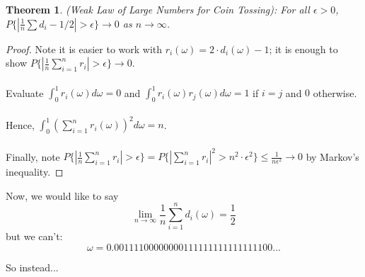 \documentclass[12pt]{article}
\newtheorem{theorem}{Theorem}
\begin{document}
\begin{theorem}
(Weak Law of Large Numbers for Coin Tossing): For all $\epsilon > 0$, $P \{ | \frac{1}{n} \sum d_i - 1/2 | > \epsilon \} \rightarrow 0$ as $n \rightarrow \infty$.
\end{theorem}
\begin{proof}
Note it is easier to work with $r_i(\omega) = 2 \cdot d_i(\omega) - 1$; it is enough to show $P\{ | \frac{1}{n} \sum_{i=1}^n r_i | > \epsilon \} \rightarrow 0$.
\\ \\
Evaluate $\int_0^1 r_i(\omega) d\omega = 0$ and $\int_0^1 r_i(\omega) r_j(\omega) d\omega = 1$ if $i = j$ and $0$ otherwise.
\\ \\
Hence, $\int_0^1 (\sum_{i=1}^n r_i(\omega) )^2 d\omega = n$.
\\ \\
Finally, note $P \{ | \frac{1}{n} \sum_{i=1}^n r_i | > \epsilon \} = P \{ | \sum_{i=1}^n r_i |^2 > n^2 \cdot \epsilon^2 \} \le \frac{1}{n \epsilon^2} \rightarrow 0$ by Markov's inequality.
\end{proof}

Now, we would like to say
$$\lim_{n \to \infty} \frac{1}{n} \sum_{i=1}^n d_i(\omega) = \frac{1}{2}$$
but we can't:
$$ \omega = 0.00111100000000111111111111111100...$$

So instead...
\end{document}
